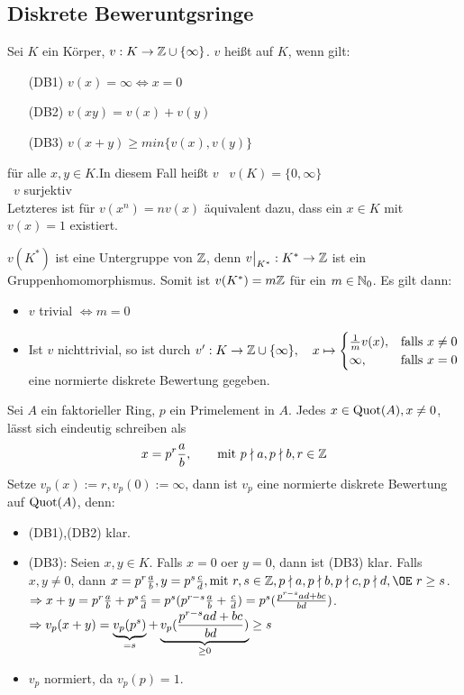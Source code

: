 \subsection{Diskrete Beweruntgsringe}
\begin{df} \label{17.1}
	Sei $K$ ein Körper, $v: K \to \mathbb{Z} \cup \{\infty\}$. $v$ heißt  auf $K$, wenn gilt: 
	\begin{enumerate}
		\item[(DB1)] $ v(x) = \infty \Leftrightarrow x = 0 $
		\item[(DB2)] $v(xy) = v(x) + v(y) $
		\item[(DB3)] $v(x+y) \geq min\{v(x),v(y)\}$
	\end{enumerate}
	für alle $x,y \in K $.In diesem Fall heißt $v$   \ $v(K) = \{0,\infty\} $ \\
	  \ $v$ surjektiv \\
	Letzteres ist für $v(x^n) = nv(x) $ äquivalent dazu, dass ein $x \in K $ mit $v(x) = 1 $ existiert. 
\end{df}
\begin{anm}
	$v(K^{*})$ ist eine Untergruppe von $\mathbb{Z}$, denn $ v \big|_{K^{*}} : K^{*} \to \mathbb{Z} $ ist ein Gruppenhomomorphismus. Somit ist $v(K^{*}) = m\mathbb{Z} $ für ein $ m \in \mathbb{N}_0$. Es gilt dann: 
	\begin{itemize}
		\item $v$ trivial $\Leftrightarrow m = 0$
		\item Ist $v$ nichttrivial, so ist durch $v': K \to \mathbb{Z} \cup \{\infty\}, \quad x \mapsto \begin{cases}
		\frac{1}{m}v(x), &\text{falls} \ x \neq 0 \\ \infty, & \text{falls} \ x = 0 
		\end{cases} $
		eine normierte diskrete Bewertung gegeben.
	\end{itemize}
\end{anm}
\begin{bsp} \label{17.2}
	Sei $A$ ein faktorieller Ring, $p$ ein Primelement in $A$. Jedes  $x \in \operatorname{Quot}(A), x \neq 0 $, lässt sich eindeutig schreiben als
	$$ x = p^r\frac{a}{b}, \qquad \text{mit} \ p \nmid a, p\nmid b, r \in \mathbb{Z} $$
	Setze $v_p(x) := r, v_p(0) := \infty$, dann ist $v_p$ eine normierte diskrete Bewertung auf $\operatorname{Quot}(A)$, denn: 
	\begin{itemize}
		\item (DB1),(DB2) klar.
		\item (DB3): Seien $x,y \in K $. Falls $x=0$ oer $y=0 $, dann ist (DB3) klar. Falls $x,y \neq 0 $, dann $ x = p^r \frac{a}{b}, y= p^s\frac{c}{d}, \text{mit } r,s \in \Z, p\nmid a, p\nmid b, p\nmid c, p\nmid d, \OE \ r \geq s $. \\
		$\Rightarrow x+y = p^r \frac{a}{b} + p^s\frac{c}{d} = p^s(p^{r-s}\frac{a}{b}+\frac{c}{d}) = p^s(\frac{p^{r-s}ad+bc}{bd})$. \\
		$\Rightarrow v_p(x+y) = \underbrace{v_p(p^s)}_{=s} +\underbrace{v_p(\frac{p^{r-s}ad+bc}{bd})}_{\geq 0} \geq s$
		\item $v_p$ normiert, da $v_p(p) = 1$.
	\end{itemize}
\end{bsp}
